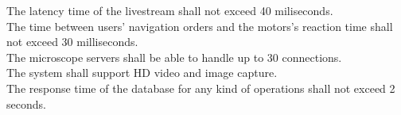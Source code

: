 \req The latency time of the livestream shall not exceed 40 miliseconds. \\
\req The time between users' navigation orders and the motors's reaction time shall not exceed 30 milliseconds. \\
\req The microscope servers shall be able to handle up to 30 connections. \\
\req The system shall support HD video and image capture. \\
\req The response time of the database for any kind of operations shall not exceed 2 seconds. \\